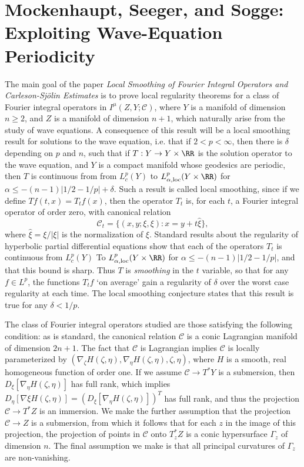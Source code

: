 \chapter{Mockenhaupt, Seeger, and Sogge: Exploiting Wave-Equation Periodicity}

The main goal of the paper \emph{Local Smoothing of Fourier Integral Operators and {C}arleson-{S}j\"{o}lin Estimates} is to prove local regularity theorems for a class of Fourier integral operators in $I^\mu(Z,Y;\mathcal{C})$, where $Y$ is a manifold of dimension $n \geq 2$, and $Z$ is a manifold of dimension $n+1$, which naturally arise from the study of wave equations. A consequence of this result will be a local smoothing result for solutions to the wave equation, i.e. that if $2 < p < \infty$, then there is $\delta$ depending on $p$ and $n$, such that if $T: Y \to Y \times \RR$ is the solution operator to the wave equation, and $Y$ is a compact manifold whose geodesics are periodic, then $T$ is continuous from from $L^p_c(Y)$ to $L^p_{\alpha,\text{loc}}(Y \times \RR)$ for $\alpha \leq -(n-1)|1/2 - 1/p| + \delta$. Such a result is called local smoothing, since if we define $Tf(t,x) = T_tf(x)$, then the operator $T_t$ is, for each $t$, a Fourier integral operator of order zero, with canonical relation
%
\[ \mathcal{C}_t = \{ (x,y;\xi,\xi) : x = y + t \widehat{\xi} \}, \]
%
where $\widehat{\xi} = \xi / |\xi|$ is the normalization of $\xi$. Standard results about the regularity of hyperbolic partial differential equations show that each of the operators $T_t$ is continuous from $L^p_c(Y)$ To $L^p_{\alpha,\text{loc}}(Y \times \RR)$ for $\alpha \leq -(n-1)|1/2 - 1/p|$, and that this bound is sharp. Thus $T$ is \emph{smoothing} in the $t$ variable, so that for any $f \in L^p$, the functions $T_t f$ `on average' gain a regularity of $\delta$ over the worst case regularity at each time. The local smoothing conjecture states that this result is true for any $\delta < 1/p$.

The class of Fourier integral operators studied are those satisfying the following condition: as is standard, the canonical relation $\mathcal{C}$ is a conic Lagrangian manifold of dimension $2n + 1$. The fact that $\mathcal{C}$ is Lagrangian implies $\mathcal{C}$ is locally parameterized by $(\nabla_\zeta H(\zeta, \eta), \nabla_\eta H(\zeta, \eta),\zeta,\eta)$, where $H$ is a smooth, real homogeneous function of order one. If we assume $\mathcal{C} \to T^* Y$ is a submersion, then $D_\xi [\nabla_\eta H(\zeta,\eta)]$ has full rank, which implies $D_\eta [\nabla \xi H(\zeta, \eta)] = (D_\xi [\nabla_\eta H(\zeta, \eta)])^T$ has full rank, and thus the projection $\mathcal{C} \to T^* Z$ is an immersion. We make the further assumption that the projection $\mathcal{C} \to Z$ is a submersion, from which it follows that for each $z$ in the image of this projection, the projection of points in $\mathcal{C}$ onto $T^*_z Z$ is a conic hypersurface $\Gamma_z$ of dimension $n$. The final assumption we make is that all principal curvatures of $\Gamma_z$ are non-vanishing.

